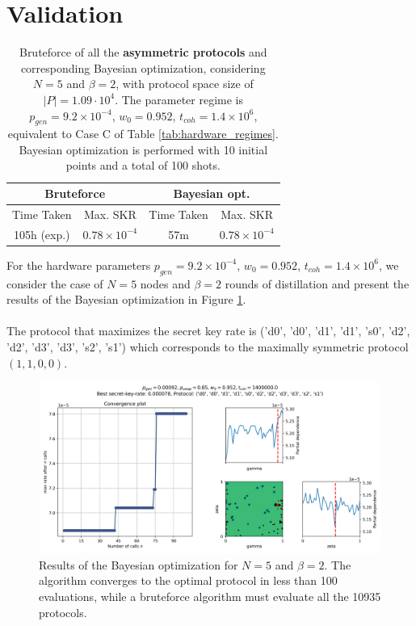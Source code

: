 \documentclass{article}
\begin{document}
\clearpage
\section*{Validation}

\begin{table}[ht!]
  \centering
  \begin{tabular}{|c|c|c|c|}
      \hline
      \multicolumn{2}{|c|}{Bruteforce} & \multicolumn{2}{c|}{Bayesian opt.} \\
      \hline
      Time Taken & Max. SKR & Time Taken & Max. SKR \\
      \hline
      \hline
      105h (exp.) & $0.78 \times 10^{-4}$ & 57m & $0.78 \times 10^{-4}$ \\
      \hline
  \end{tabular}
  \caption{Bruteforce of all the \textbf{asymmetric protocols} and corresponding Bayesian optimization, considering $N=5$ and $\beta=2$, with protocol space size of $|P| = 1.09 \cdot 10^4$. The parameter regime is $p_{gen} = 9.2 \times 10^{-4}$, $w_0 = 0.952$, $t_{coh} = 1.4 \times 10^6$, equivalent to Case C of Table \ref{tab:hardware_regimes}. Bayesian optimization is performed with 10 initial points and a total of 100 shots.}
  \label{tab:validation_regimes}
\end{table}

For the hardware parameters $p_{gen} = 9.2 \times 10^{-4}$, $w_0 = 0.952$, $t_{coh} = 1.4 \times 10^6$, we consider the case of $N=5$ nodes and $\beta=2$ rounds of distillation and present the results of the Bayesian optimization in Figure \ref{fig:gp_validation}.
\\\\
The protocol that maximizes the secret key rate is
  ('d0', 'd0', 'd1', 'd1', 's0', 'd2', 'd2', 'd3', 'd3', 's2', 's1')
which corresponds to the maximally symmetric protocol $(1,1,0,0)$.

\begin{figure}[ht!]
  \centering
  \includegraphics[width=\linewidth, trim=10 10 10 40, clip]{asymmetric/gp5,2/skopt_gp.png}
  \caption{Results of the Bayesian optimization for $N=5$ and $\beta=2$. The algorithm converges to the optimal protocol in less than 100 evaluations, while a bruteforce algorithm must evaluate all the 10935 protocols.}
  \label{fig:gp_validation} 
\end{figure}
\end{document}
